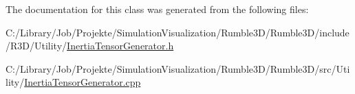 The documentation for this class was generated from the following files\+:\begin{DoxyCompactItemize}
\item 
C\+:/\+Library/\+Job/\+Projekte/\+Simulation\+Visualization/\+Rumble3\+D/\+Rumble3\+D/include/\+R3\+D/\+Utility/\mbox{\hyperlink{_inertia_tensor_generator_8h}{Inertia\+Tensor\+Generator.\+h}}\item 
C\+:/\+Library/\+Job/\+Projekte/\+Simulation\+Visualization/\+Rumble3\+D/\+Rumble3\+D/src/\+Utility/\mbox{\hyperlink{_inertia_tensor_generator_8cpp}{Inertia\+Tensor\+Generator.\+cpp}}\end{DoxyCompactItemize}
